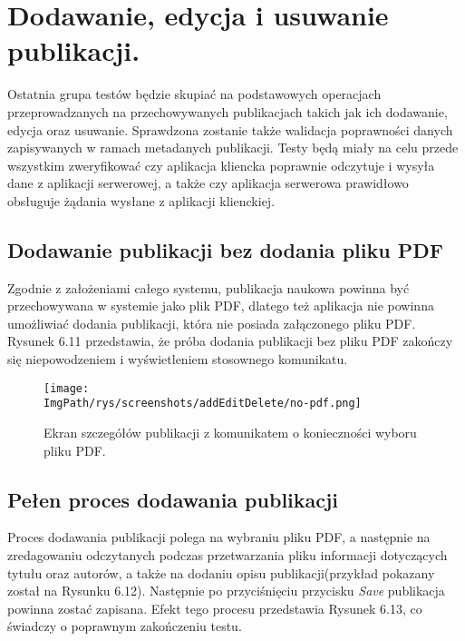 \documentclass[a4paper,12pt,twoside,openany]{report}
\newcommand{\ImgPath}{.}
\begin{document}
\section{Dodawanie, edycja i usuwanie publikacji.}

Ostatnia grupa testów będzie skupiać na podstawowych operacjach przeprowadzanych na przechowywanych publikacjach takich jak ich dodawanie, edycja oraz usuwanie. Sprawdzona zostanie także walidacja poprawności danych zapisywanych w ramach metadanych publikacji. Testy będą miały na celu przede wszystkim zweryfikować czy aplikacja kliencka poprawnie odczytuje i wysyła dane z aplikacji serwerowej, a także czy aplikacja serwerowa prawidłowo obsługuje żądania wysłane z aplikacji klienckiej.

\subsection{Dodawanie publikacji bez dodania pliku PDF}
Zgodnie z założeniami całego systemu, publikacja naukowa powinna być przechowywana w systemie jako plik PDF, dlatego też aplikacja nie powinna umożliwiać dodania publikacji, która nie posiada załączonego pliku PDF. Rysunek 6.11 przedstawia, że próba dodania publikacji bez pliku PDF zakończy się niepowodzeniem i wyświetleniem stosownego komunikatu.

\begin{figure}[!htbp]
	\begin{center}
		\centering
		\texttt{[image: \\ImgPath/rys/screenshots/addEditDelete/no-pdf.png]}
	\end{center}
	\caption{Ekran szczegółów publikacji z komunikatem o konieczności wyboru pliku PDF.}
	\label{zrzutPrzetwarzaniePusty}
\end{figure}

\subsection{Pełen proces dodawania publikacji}
Proces dodawania publikacji polega na wybraniu pliku PDF, a następnie na zredagowaniu odczytanych podczas przetwarzania pliku informacji dotyczących tytułu oraz autorów, a także na dodaniu opisu publikacji(przykład pokazany został na Rysunku 6.12). Następnie po przyciśnięciu przycisku \textit{Save} publikacja powinna zostać zapisana. Efekt tego procesu przedstawia Rysunek 6.13, co świadczy o poprawnym zakończeniu testu.

\pagebreak
\end{document}
